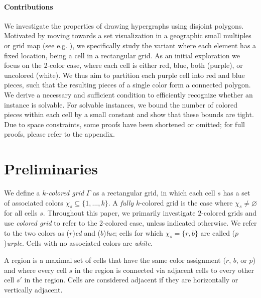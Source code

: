 \documentclass[runningheads]{llncs}
\let\emptyset\varnothing
\begin{document}
\paragraph{Contributions}
We investigate the properties of drawing hypergraphs using disjoint polygons.
Motivated by moving towards a set visualization in a geographic small multiples or grid map (see e.g. \cite{Meulemans2017,Wood2008}), we specifically study the variant where each element has a fixed location, being a cell in a rectangular grid.
As an initial exploration we focus on the 2-color case, where each cell is either red, blue, both (purple), or uncolored (white).
We thus aim to partition each purple cell into red and blue pieces, such that the resulting pieces of a single color form a connected polygon.
We derive a necessary and sufficient condition to efficiently recognize whether an instance is solvable.
For solvable instances, we bound the number of colored pieces within each cell by a small constant and show that these bounds are tight.
Due to space constraints, some proofs have been shortened or omitted; for full proofs, please refer to the appendix.


\section{Preliminaries}
\label{sec:prelims}

We define a \emph{$k$-colored grid} $\Gamma$ as a rectangular grid, in which each cell $s$ has a set of associated colors $\chi_s \subseteq \{1,\ldots,k\}$.
A \emph{fully} $k$-colored grid is the case where $\chi_s \neq \emptyset$ for all cells $s$.
Throughout this paper, we primarily investigate $2$-colored grids and use \emph{colored grid} to refer to the 2-colored case, unless indicated otherwise.
We refer to the two colors as ($r$)\emph{ed} and ($b$)\emph{lue}; cells for which $\chi_s = \{r,b\}$ are called ($p$)\emph{urple}.
Cells with no associated colors are \emph{white}.

A region is a maximal set of cells that have the same color assignment ($r$, $b$, or $p$) and where every cell $s$ in the region is connected via adjacent cells to every other cell $s'$ in the region. Cells are considered adjacent if they are horizontally or vertically adjacent.
\end{document}
